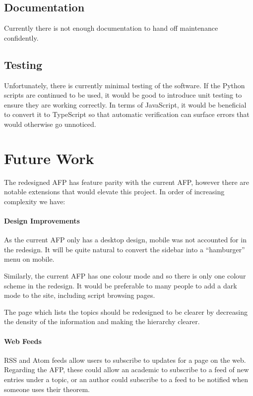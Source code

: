 \documentclass[bsc,frontabs,oneside,singlespacing,parskip,deptreport,logo]{infthesis}
\begin{document}
\subsection{Documentation}

Currently there is not enough documentation to hand off maintenance confidently. 

\subsection{Testing}

Unfortunately, there is currently minimal testing of the software. If the Python scripts are continued to be used, it would be good to introduce unit testing to ensure they are working correctly. In terms of JavaScript, it would be beneficial to convert it to TypeScript so that automatic verification can surface errors that would otherwise go unnoticed.

\section{Future Work}

The redesigned AFP has feature parity with the current AFP, however there are notable extensions that would elevate this project. In order of increasing complexity we have:

\paragraph*{Design Improvements}

As the current AFP only has a desktop design, mobile was not accounted for in the redesign. It will be quite natural to convert the sidebar into a ``hamburger'' menu on mobile.

Similarly, the current AFP has one colour mode and so there is only one colour scheme in the redesign. It would be preferable to many people to add a dark mode to the site, including script browsing pages.

The page which lists the topics should be redesigned to be clearer by decreasing the density of the information and making the hierarchy clearer.

\paragraph*{Web Feeds}

RSS and Atom feeds allow users to subscribe to updates for a  page on the web. Regarding the AFP, these could allow an academic to subscribe to a feed of new entries under a topic, or an author could subscribe to a feed to be notified when someone uses their theorem. 
\end{document}
